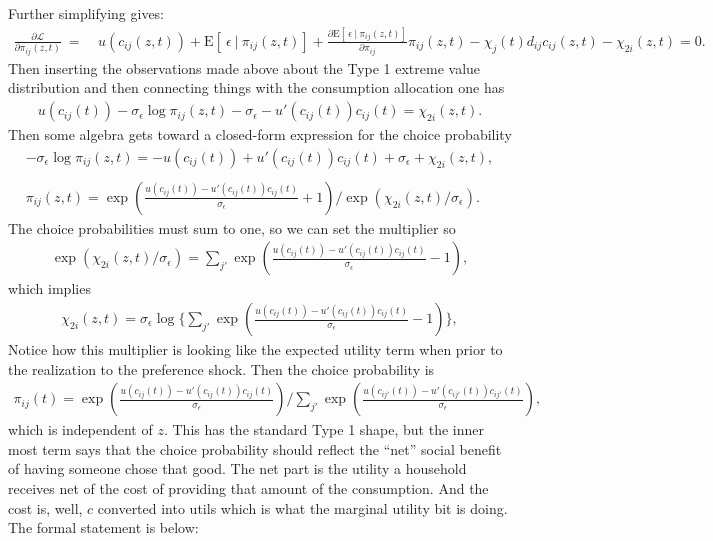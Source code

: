 \documentclass[12pt,pdftex]{article}
\begin{document}
\begin{onehalfspacing}
Further simplifying gives:
\begin{align}
\frac{\partial \mathcal{L} }{\partial \pi_{ij}(z, t)} \ = \ &  u(c_{ij}(z, t) ) + \mathrm{E}[ \ \epsilon \ | \ \pi_{ij}(z,t) ] + \frac{\partial \mathrm{E}[ \ \epsilon \ | \ \pi_{ij}(z,t) ]}{\partial \pi_{ij}} \pi_{ij}(z, t)  - \chi_{j}(t) d_{ij} c_{ij}(z, t)  - \chi_{2i}(z,t)  = 0.
\end{align}
Then inserting the observations made above about the Type 1 extreme value distribution and then connecting things with the consumption allocation one has
\begin{align}
u(c_{ij}(t) ) -\sigma_{\epsilon} \log \pi_{ij}(z,t) - \sigma_{\epsilon} - u'(c_{ij}(t) )c_{ij}(t)   = \chi_{2i}(z,t).
\end{align}
Then some algebra gets toward a closed-form expression for the choice probability
\begin{align}
-\sigma_{\epsilon} \log \pi_{ij}(z,t) = -u(c_{ij}(t)  ) + u'(c_{ij}(t) )c_{ij}(t)  + \sigma_{\epsilon} + \chi_{2i}(z,t), \\
\nonumber \\
\pi_{ij}(z,t) = \exp \left( \frac{u(c_{ij}(t)  ) - u'(c_{ij}(t))c_{ij}(t)}{\sigma_{\epsilon}} + 1 \right) \bigg / \exp \left( \chi_{2i}(z,t) / \sigma_{\epsilon} \right).
\end{align}
The choice probabilities must sum to one, so we can set the multiplier so
\begin{align}
\exp \left( \chi_{2i}(z,t) / \sigma_{\epsilon} \right) = \sum_{j'}\exp \left( \frac{u(c_{ij}(t)) - u'(c_{ij}(t))c_{ij}(t)}{\sigma_{\epsilon}} - 1 \right),
\end{align}
which implies
\begin{align}
\chi_{2i}(z,t) = \sigma_{\epsilon}  \log \bigg \{ \sum_{j'}\exp \left( \frac{u(c_{ij}(t)) - u'(c_{ij}(t))c_{ij}(t)}{\sigma_{\epsilon}} - 1 \right) \bigg \},
\end{align}
Notice how this multiplier is looking like the expected utility term when prior to the realization to the preference shock. Then the choice probability is
\begin{align}
\pi_{ij}(t) =\exp \left( \frac{u(c_{ij}(t)) - u'(c_{ij}(t))c_{ij}(t)}{\sigma_{\epsilon}}\right) \bigg / \sum_{j'}\exp \left( \frac{u(c_{ij'}(t)) - u'(c_{ij'}(t))c_{ij'}(t)}{\sigma_{\epsilon}} \right),
\end{align}
which is independent of $z$. This has the standard Type 1 shape, but the inner most term says that the choice probability should reflect the ``net'' social benefit of having someone chose that good. The net part is the utility a household receives net of the cost of providing that amount of the consumption. And the cost is, well, $c$ converted into utils which is what the marginal utility bit is doing. The formal statement is below:


\end{onehalfspacing}
\end{document}
